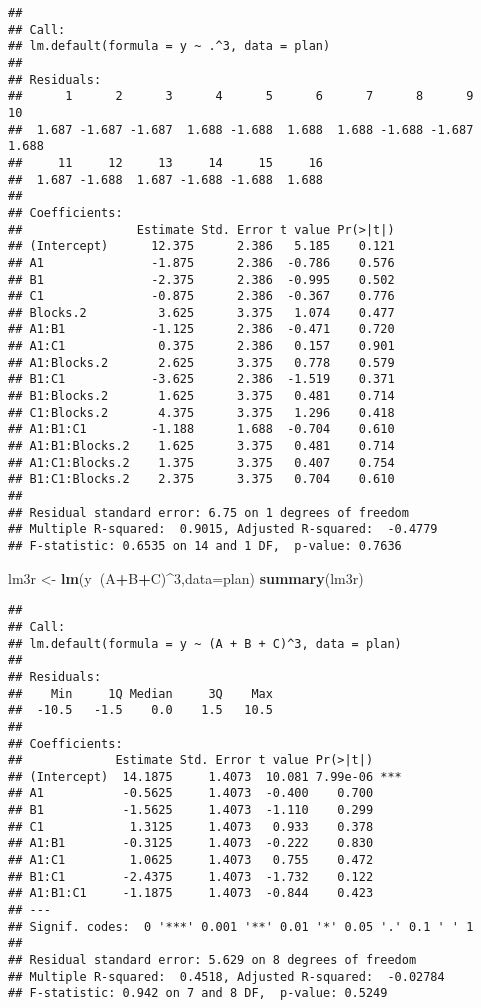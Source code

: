 \documentclass[]{article}
\newenvironment{Shaded}{\begin{snugshade}}{\end{snugshade}}
\newcommand{\KeywordTok}[1]{\textcolor[rgb]{0.13,0.29,0.53}{\textbf{#1}}}
\newcommand{\DataTypeTok}[1]{\textcolor[rgb]{0.13,0.29,0.53}{#1}}
\newcommand{\DecValTok}[1]{\textcolor[rgb]{0.00,0.00,0.81}{#1}}
\newcommand{\StringTok}[1]{\textcolor[rgb]{0.31,0.60,0.02}{#1}}
\newcommand{\OperatorTok}[1]{\textcolor[rgb]{0.81,0.36,0.00}{\textbf{#1}}}
\newcommand{\NormalTok}[1]{#1}
\begin{document}
\begin{verbatim}
## 
## Call:
## lm.default(formula = y ~ .^3, data = plan)
## 
## Residuals:
##      1      2      3      4      5      6      7      8      9     10 
##  1.687 -1.687 -1.687  1.688 -1.688  1.688  1.688 -1.688 -1.687  1.688 
##     11     12     13     14     15     16 
##  1.687 -1.688  1.687 -1.688 -1.688  1.688 
## 
## Coefficients:
##                Estimate Std. Error t value Pr(>|t|)
## (Intercept)      12.375      2.386   5.185    0.121
## A1               -1.875      2.386  -0.786    0.576
## B1               -2.375      2.386  -0.995    0.502
## C1               -0.875      2.386  -0.367    0.776
## Blocks.2          3.625      3.375   1.074    0.477
## A1:B1            -1.125      2.386  -0.471    0.720
## A1:C1             0.375      2.386   0.157    0.901
## A1:Blocks.2       2.625      3.375   0.778    0.579
## B1:C1            -3.625      2.386  -1.519    0.371
## B1:Blocks.2       1.625      3.375   0.481    0.714
## C1:Blocks.2       4.375      3.375   1.296    0.418
## A1:B1:C1         -1.188      1.688  -0.704    0.610
## A1:B1:Blocks.2    1.625      3.375   0.481    0.714
## A1:C1:Blocks.2    1.375      3.375   0.407    0.754
## B1:C1:Blocks.2    2.375      3.375   0.704    0.610
## 
## Residual standard error: 6.75 on 1 degrees of freedom
## Multiple R-squared:  0.9015, Adjusted R-squared:  -0.4779 
## F-statistic: 0.6535 on 14 and 1 DF,  p-value: 0.7636
\end{verbatim}

\begin{Shaded}
\begin{Highlighting}[]
\NormalTok{lm3r <-}\StringTok{ }\KeywordTok{lm}\NormalTok{(y}\OperatorTok{~}\NormalTok{(A}\OperatorTok{+}\NormalTok{B}\OperatorTok{+}\NormalTok{C)}\OperatorTok{^}\DecValTok{3}\NormalTok{,}\DataTypeTok{data=}\NormalTok{plan)}
\KeywordTok{summary}\NormalTok{(lm3r)}
\end{Highlighting}
\end{Shaded}

\begin{verbatim}
## 
## Call:
## lm.default(formula = y ~ (A + B + C)^3, data = plan)
## 
## Residuals:
##    Min     1Q Median     3Q    Max 
##  -10.5   -1.5    0.0    1.5   10.5 
## 
## Coefficients:
##             Estimate Std. Error t value Pr(>|t|)    
## (Intercept)  14.1875     1.4073  10.081 7.99e-06 ***
## A1           -0.5625     1.4073  -0.400    0.700    
## B1           -1.5625     1.4073  -1.110    0.299    
## C1            1.3125     1.4073   0.933    0.378    
## A1:B1        -0.3125     1.4073  -0.222    0.830    
## A1:C1         1.0625     1.4073   0.755    0.472    
## B1:C1        -2.4375     1.4073  -1.732    0.122    
## A1:B1:C1     -1.1875     1.4073  -0.844    0.423    
## ---
## Signif. codes:  0 '***' 0.001 '**' 0.01 '*' 0.05 '.' 0.1 ' ' 1
## 
## Residual standard error: 5.629 on 8 degrees of freedom
## Multiple R-squared:  0.4518, Adjusted R-squared:  -0.02784 
## F-statistic: 0.942 on 7 and 8 DF,  p-value: 0.5249
\end{verbatim}
\end{document}
